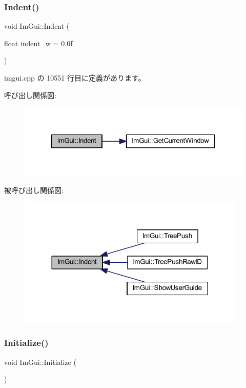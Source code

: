 \subsubsection{\texorpdfstring{Indent()}{Indent()}}
{\footnotesize\ttfamily void Im\+Gui\+::\+Indent (\begin{DoxyParamCaption}\item[{float}]{indent\+\_\+w = {\ttfamily 0.0f} }\end{DoxyParamCaption})}



 imgui.\+cpp の 10551 行目に定義があります。

呼び出し関係図\+:\nopagebreak
\begin{figure}[H]
\begin{center}
\leavevmode
\includegraphics[width=320pt]{namespace_im_gui_a6c7b9f2d60951462eeebad80154a8926_cgraph}
\end{center}
\end{figure}
被呼び出し関係図\+:\nopagebreak
\begin{figure}[H]
\begin{center}
\leavevmode
\includegraphics[width=308pt]{namespace_im_gui_a6c7b9f2d60951462eeebad80154a8926_icgraph}
\end{center}
\end{figure}
\mbox{\label{namespace_im_gui_a1a611da38fae18a3d1dafcb3228259da}} 
\subsubsection{\texorpdfstring{Initialize()}{Initialize()}}
{\footnotesize\ttfamily void Im\+Gui\+::\+Initialize (\begin{DoxyParamCaption}{ }\end{DoxyParamCaption})}



